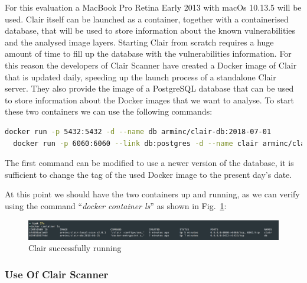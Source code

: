 \documentclass[a4paper,12pt]{article}
\def\myfig#1{Fig.~#1\xspace}
\begin{document}
For this evaluation a MacBook Pro Retina Early 2013 with macOs 10.13.5 will be
used. Clair itself can be launched as a container, together with a containerised
database, that will be used to store information about the known vulnerabilities
and the analysed image layers. Starting Clair from scratch requires a huge
amount of time to fill up the database with the vulnerabilities information. For
this reason the developers of Clair Scanner have created a Docker image of Clair
that is updated daily, speeding up the launch process of a standalone Clair
server. They also provide the image of a PostgreSQL database that can be used to
store information about the Docker images that we want to analyse. To start
these two containers we can use the following commands: 
\begin{lstlisting}[language=bash,breaklines]
  docker run -p 5432:5432 -d --name db arminc/clair-db:2018-07-01
  docker run -p 6060:6060 --link db:postgres -d --name clair arminc/clair-local-scan:v2.0.1
\end{lstlisting}
The first command can be modified to use a newer version of the database, it is
sufficient to change the tag of the used Docker image to the present day's date.
\par At this point we should have the two containers up and running, as we can
verify using the command ``\textit{docker container ls}'' as shown in
\myfig{\ref{fig:clair_running}}: 

\begin{figure}[ht!]
  \centerline{\includegraphics[width=1\textwidth]{clair_running.png}}
  \caption{Clair successfully running}
  \label{fig:clair_running}
  \end{figure}

\subsubsection{Use Of Clair Scanner}
\end{document}

